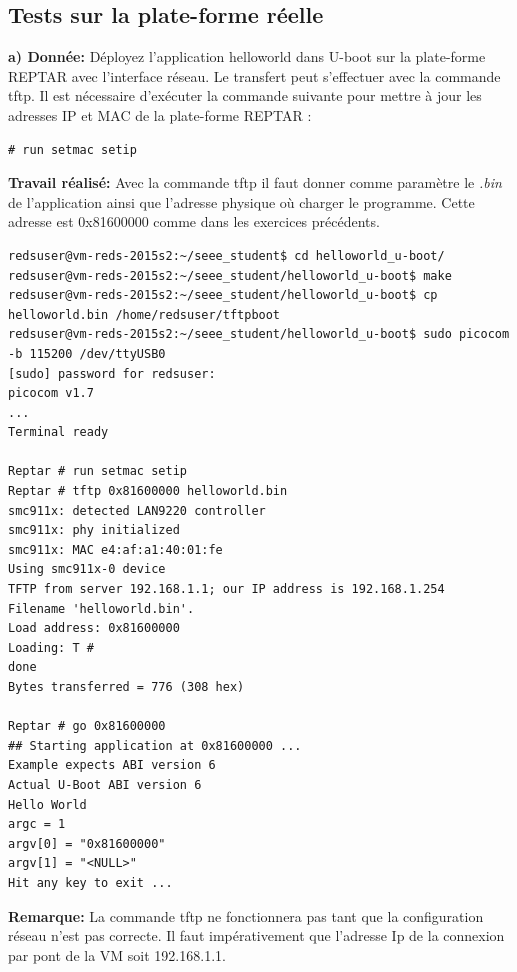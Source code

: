 \subsection{Tests sur la plate-forme réelle}
\textbf{a) Donnée: }Déployez l'application helloworld dans U-boot sur la plate-forme REPTAR avec l'interface réseau.
Le transfert peut s'effectuer avec la commande tftp.
Il est nécessaire d’exécuter la commande suivante pour mettre à jour les adresses IP et MAC de la plate-forme
REPTAR : 
\begin{lstlisting}
# run setmac setip 
\end{lstlisting}
\textbf{Travail réalisé: }Avec la commande tftp il faut donner comme paramètre le \textit{.bin} de l'application ainsi que l'adresse physique où charger le programme. Cette adresse est 0x81600000 comme dans les exercices précédents.
\begin{lstlisting}
redsuser@vm-reds-2015s2:~/seee_student$ cd helloworld_u-boot/
redsuser@vm-reds-2015s2:~/seee_student/helloworld_u-boot$ make
redsuser@vm-reds-2015s2:~/seee_student/helloworld_u-boot$ cp helloworld.bin /home/redsuser/tftpboot
redsuser@vm-reds-2015s2:~/seee_student/helloworld_u-boot$ sudo picocom -b 115200 /dev/ttyUSB0 
[sudo] password for redsuser: 
picocom v1.7
...
Terminal ready

Reptar # run setmac setip
Reptar # tftp 0x81600000 helloworld.bin
smc911x: detected LAN9220 controller
smc911x: phy initialized
smc911x: MAC e4:af:a1:40:01:fe
Using smc911x-0 device
TFTP from server 192.168.1.1; our IP address is 192.168.1.254
Filename 'helloworld.bin'.
Load address: 0x81600000
Loading: T #
done
Bytes transferred = 776 (308 hex)

Reptar # go 0x81600000
## Starting application at 0x81600000 ...
Example expects ABI version 6
Actual U-Boot ABI version 6
Hello World
argc = 1
argv[0] = "0x81600000"
argv[1] = "<NULL>"
Hit any key to exit ... 
\end{lstlisting}
\textbf{Remarque: }La commande tftp ne fonctionnera pas tant que la configuration réseau n'est pas correcte. Il faut impérativement que l'adresse Ip de la connexion par pont de la VM soit 192.168.1.1.
